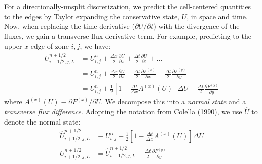 For a directionally-unsplit discretization, we predict the
cell-centered quantities to the edges by Taylor expanding the
conservative state, $U$, in space and time.  Now, when replacing the
time derivative ($\partial U/\partial t$) with the divergence of the
fluxes, we gain a transverse flux derivative term.  For example,
predicting to the upper $x$ edge of zone $i,j$, we have:
\begin{align}
U_{i+1/2,j,L}^{n+1/2} &= U_{i,j}^n + \frac{\Delta x}{2} \frac{\partial U}{\partial x} 
                            + \frac{\Delta t}{2} \frac{\partial U}{\partial t} + \ldots \\
&= U_{i,j}^n + \frac{\Delta x}{2} \frac{\partial U}{\partial x} 
                            - \frac{\Delta t}{2} \frac{\partial F^{(x)}}{\partial x} 
                            - \frac{\Delta t}{2} \frac{\partial F^{(y)}}{\partial y} \\
&= U_{i,j}^n + \frac{1}{2} \left [ 1 - \frac{\Delta t}{\Delta x} A^{(x)}(U) \right ] \Delta U 
                            - \frac{\Delta t}{2} \frac{\partial F^{(y)}}{\partial y} \label{eq:Utaylorstate}
\end{align}
where $A^{(x)}(U) \equiv \partial F^{(x)} / \partial U$.  We decompose
this into a {\em normal state} and a {\em transverse flux difference}.
Adopting the notation from Colella (1990), we use $\hat{U}$ to denote
the normal state:
\begin{align}
\hat{U}_{i+1/2,j,L}^{n+1/2} &\equiv U_{i,j}^n 
      + \frac{1}{2} \left [ 1 - \frac{\Delta t}{\Delta x} A^{(x)}(U) \right ] \Delta U \\
U_{i+1/2,j,L}^{n+1/2} &= \hat{U}_{i+1/2,j,L}^{n+1/2}
                            - \frac{\Delta t}{2} \frac{\partial F^{(y)}}{\partial y}  \label{eq:fullleftstate}
\end{align}

